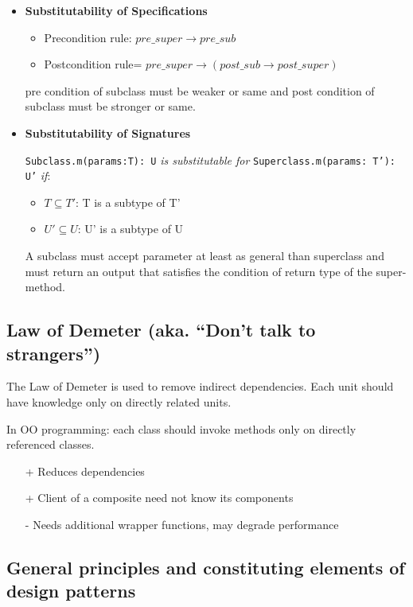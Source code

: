 \begin{itemize}
\item \textbf{Substitutability of Specifications}
\begin{itemize}
	\item Precondition rule: $pre\_super \rightarrow pre\_sub$
	\item Postcondition rule= $pre\_super \rightarrow (post\_sub \rightarrow post\_super)$
\end{itemize}
pre condition of subclass must be weaker or same and
post condition of subclass must be stronger or same.

\item \textbf{Substitutability of Signatures}


\texttt{Subclass.m(params:T): U} \textit{is substitutable for}
\texttt{Superclass.m(params: T'): U'} \textit{if}:
\begin{itemize}
    \item $T \subseteq T'$: T is a subtype of T'
	\item $U' \subseteq U$: U' is a subtype of U
\end{itemize}

A subclass must accept parameter at least as general than superclass and
must return an output that satisfies the condition of return type of the
super-method.
\end{itemize}

\subsection{Law of Demeter (aka. \enquote{Don't talk to strangers})}

The Law of Demeter is used to remove indirect dependencies. Each unit
should have knowledge only on directly related units. \newline

In OO programming: each class should invoke methods only on directly
referenced classes.

\begin{itemize}
    \item[+] Reduces dependencies
    \item[+] Client of a composite need not know its components
    \item[-] Needs additional wrapper functions, may degrade performance
\end{itemize}

\subsection{General principles and constituting elements of design patterns}

